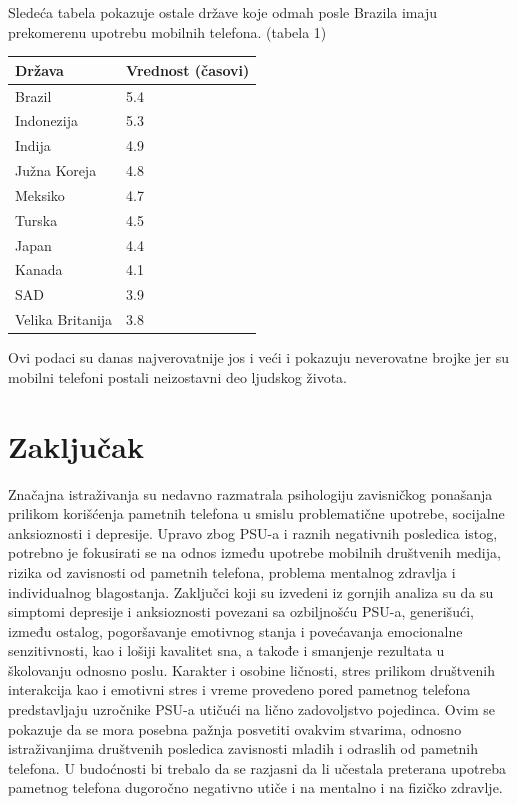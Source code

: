 \documentclass[a4paper]{article}
\begin{document}
Sledeća tabela pokazuje ostale države koje odmah posle Brazila imaju
prekomerenu upotrebu mobilnih telefona. (tabela 1) \cite{table}

\begin{center}
    \begin{tabular}{ |l|l|} 
    \hline
  Država&Vrednost (časovi)\\
  \hline
  Brazil & 5.4 \\
  Indonezija & 5.3 \\
  Indija & 4.9 \\
  Južna Koreja & 4.8 \\
  Meksiko & 4.7 \\
  Turska & 4.5   \\
  Japan & 4.4  \\
  Kanada & 4.1    \\
  SAD & 3.9  \\
  Velika Britanija & 3.8  \\
  \hline  
   
    \hline
    \end{tabular}
\end{center}

Ovi podaci su danas najverovatnije jos i veći i pokazuju neverovatne
brojke jer su mobilni telefoni postali neizostavni deo ljudskog života.

\section{Zaključak}

Značajna istraživanja su nedavno razmatrala psihologiju zavisničkog
ponašanja prilikom korišćenja pametnih telefona u smislu problematične upotrebe,
socijalne anksioznosti i depresije.
Upravo zbog PSU-a i raznih negativnih posledica istog, potrebno je fokusirati se na odnos između
upotrebe mobilnih društvenih medija, rizika od zavisnosti od pametnih telefona,
problema mentalnog zdravlja i individualnog blagostanja. Zaključci koji su izvedeni
iz gornjih analiza su da su simptomi depresije i anksioznosti povezani sa
ozbiljnošću PSU-a, generišući, između ostalog,
pogoršavanje emotivnog stanja i povećavanja emocionalne senzitivnosti,
kao i lošiji kavalitet sna, a takođe i smanjenje rezultata u školovanju
odnosno poslu.
Karakter i osobine ličnosti, stres prilikom društvenih interakcija kao i emotivni
stres i vreme provedeno pored pametnog telefona predstavljaju uzročnike PSU-a
utičući na lično zadovoljstvo pojedinca. Ovim se pokazuje da se mora
posebna pažnja posvetiti ovakvim stvarima, odnosno istraživanjima društvenih posledica
zavisnosti mladih i odraslih od pametnih telefona. U budoćnosti bi trebalo
da se razjasni da li učestala preterana upotreba pametnog telefona dugoročno negativno
utiče i na mentalno i na fizičko zdravlje.
\end{document}
